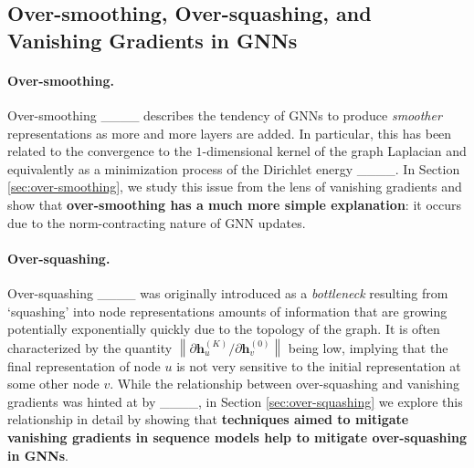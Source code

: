 \vspace{-0.2cm}



\subsection{Over-smoothing, Over-squashing, and Vanishing Gradients in GNNs}
\vspace{-0.1cm}
\paragraph{Over-smoothing.} Over-smoothing ____ describes the tendency of GNNs to produce \emph{smoother} representations as more and more layers are added. In particular, this has been related to the convergence to the $1$-dimensional kernel of the graph Laplacian and equivalently as a minimization process of the Dirichlet energy ____. In Section \ref{sec:over-smoothing}, we study this issue from the lens of vanishing gradients and show that \textbf{over-smoothing has a much more simple explanation}: it occurs due to the norm-contracting nature of GNN updates.
\vspace{-0.15cm}

\paragraph{Over-squashing.} Over-squashing ____ was originally introduced as a \textit{bottleneck} resulting from `squashing' into node representations amounts of information that are growing potentially exponentially quickly due to the topology of the graph. It is often characterized by the quantity $\left \lVert \partial \mathbf{h}_u^{(K)} / \partial \mathbf{h}_v^{(0)} \right \rVert$ being low, implying that the final representation of node $u$ is not very sensitive to the initial representation at some other node $v$. While the relationship between over-squashing and vanishing gradients was hinted at by ____, in Section \ref{sec:over-squashing} we explore this relationship in detail by showing that \textbf{techniques aimed to mitigate vanishing gradients in sequence models help to mitigate over-squashing in GNNs}.

\vspace{-0.3cm}
